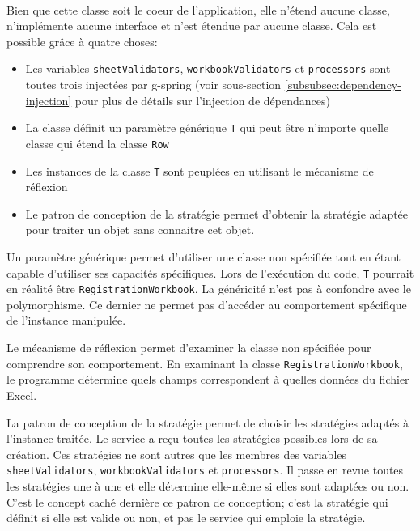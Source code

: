 \paragraph{}
Bien que cette classe soit le coeur de l'application, elle n'étend aucune classe, n'implémente aucune interface et n'est étendue par aucune classe.
Cela est possible grâce à quatre choses:
\begin{itemize}
    \item Les variables \lstinline{sheetValidators}, \lstinline{workbookValidators} et \lstinline{processors} sont toutes trois injectées par \Gls{g-spring} (voir sous-section \ref{subsubsec:dependency-injection} pour plus de détails sur l'injection de dépendances)
    \item La classe définit un paramètre générique \lstinline{T} qui peut être n'importe quelle classe qui étend la classe \lstinline{Row}
    \item Les instances de la classe \lstinline{T} sont peuplées en utilisant le mécanisme de réflexion\fnmark{}
    \item Le patron de conception de la stratégie permet d'obtenir la stratégie adaptée pour traiter un objet sans connaitre cet objet.
\end{itemize}

Un paramètre générique permet d'utiliser une classe non spécifiée tout en étant capable d'utiliser ses capacités spécifiques.
Lors de l'exécution du code, \lstinline{T} pourrait en réalité être \lstinline{RegistrationWorkbook}.
La généricité n'est pas à confondre avec le polymorphisme\fnmark{}.
Ce dernier ne permet pas d'accéder au comportement spécifique de l'instance manipulée.

Le mécanisme de réflexion permet d'examiner la classe non spécifiée pour comprendre son comportement.
En examinant la classe \lstinline{RegistrationWorkbook}, le programme détermine quels champs correspondent à quelles données du fichier Excel.

La patron de conception de la stratégie permet de choisir les stratégies adaptés à l'instance traitée.
Le service a reçu toutes les stratégies possibles lors de sa création.
Ces stratégies ne sont autres que les membres des variables \lstinline{sheetValidators}, \lstinline{workbookValidators} et \lstinline{processors}.
Il passe en revue toutes les stratégies une à une et elle détermine elle-même si elles sont adaptées ou non.
C'est le concept caché dernière ce patron de conception; c'est la stratégie qui définit si elle est valide ou non, et pas le service qui emploie la stratégie.


